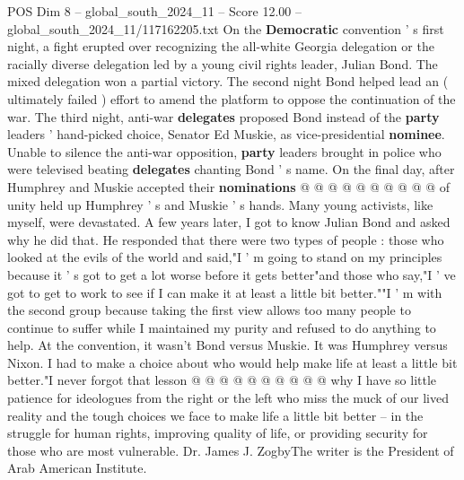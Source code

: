 \begin{textsample}{POS Dim 8 – global\_south\_2024\_11 – Score 12.00 – global\_south\_2024\_11/117162205.txt}
On the \textbf{Democratic} convention ' s first night, a fight erupted over recognizing the all-white Georgia delegation or the racially diverse delegation led by a young civil rights leader, Julian Bond.
The mixed delegation won a partial victory.
The second night Bond helped lead an ( ultimately failed ) effort to amend the platform to oppose the continuation of the war.
The third night, anti-war \textbf{delegates} proposed Bond instead of the \textbf{party} leaders ' hand-picked choice, Senator Ed Muskie, as vice-presidential \textbf{nominee}.
Unable to silence the anti-war opposition, \textbf{party} leaders brought in police who were televised beating \textbf{delegates} chanting Bond ' s name.
On the final day, after Humphrey and Muskie accepted their \textbf{nominations} @ @ @ @ @ @ @ @ @ @ of unity held up Humphrey ' s and Muskie ' s hands.
Many young activists, like myself, were devastated.
A few years later, I got to know Julian Bond and asked why he did that.
He responded that there were two types of people : those who looked at the evils of the world and said,"I ' m going to stand on my principles because it ' s got to get a lot worse before it gets better"and those who say,"I ' ve got to get to work to see if I can make it at least a little bit better.""I ' m with the second group because taking the first view allows too many people to continue to suffer while I maintained my purity and refused to do anything to help.
At the convention, it wasn't Bond versus Muskie.
It was Humphrey versus Nixon.
I had to make a choice about who would help make life at least a little bit better."I never forgot that lesson @ @ @ @ @ @ @ @ @ @ why I have so little patience for ideologues from the right or the left who miss the muck of our lived reality and the tough choices we face to make life a little bit better -- in the struggle for human rights, improving quality of life, or providing security for those who are most vulnerable.
Dr.
James J.
ZogbyThe writer is the President of Arab American Institute.

\end{textsample}
